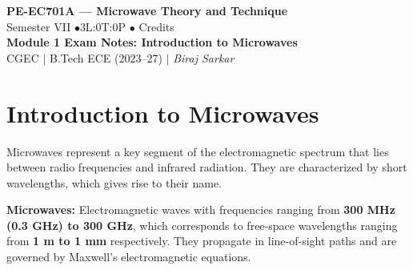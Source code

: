 \documentclass[12pt,a4paper]{article}
\begin{document}

\begin{center}
  {\LARGE\bfseries\color{myred} PE-EC701A --- Microwave Theory and Technique}\\[5pt]
  {\normalsize\color{mydark} Semester VII \quad$\bullet$\quad 3L:0T:0P \quad$\bullet$ Credits}\\[3pt]
  {\normalsize\color{myteal}\textbf{Module 1 Exam Notes: Introduction to Microwaves}}\\[3pt]
  {\small\color{mydark} CGEC \;$|$\; B.Tech ECE (2023--27) \;$|$\; \textit{Biraj Sarkar}}
\end{center}
\vspace{2pt}
\noindent{\color{myred}\rule{\linewidth}{1.5pt}}
\vspace{2pt}

\hypersetup{linkcolor=mydark}
\tableofcontents
\hypersetup{linkcolor=myteal}
\newpage

\section{Introduction to Microwaves}

Microwaves represent a key segment of the electromagnetic spectrum that lies between radio frequencies and infrared radiation. They are characterized by short wavelengths, which gives rise to their name.

\begin{tcolorbox}[defbox]
\textbf{Microwaves:} Electromagnetic waves with frequencies ranging from \textbf{300 MHz (0.3 GHz) to 300 GHz}, which corresponds to free-space wavelengths ranging from \textbf{1 m to 1 mm} respectively. They propagate in line-of-sight paths and are governed by Maxwell's electromagnetic equations.
\end{tcolorbox}
\end{document}
